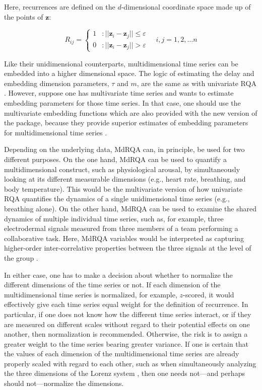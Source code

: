 Here, recurrences are defined on the $d$-dimensional coordinate space made up of the points of $\mathbf{z}$:

\begin{equation}
    R_{ij} = \left\{
  \begin{array}{lr}
    1 & : \vert\vert \mathbf{z}_i - \mathbf{z}_j \vert\vert \leq \varepsilon \\
    0 & : \vert\vert \mathbf{z}_i - \mathbf{z}_j \vert\vert > \varepsilon
  \end{array}
\right.
\quad
i,j = 1,2, \ldots n
\end{equation}

Like their unidimensional counterparts, multidimensional time series can be embedded into a higher dimensional space. The logic of estimating the delay and embedding dimension parameters, $\tau$ and $m$, are the same as with univariate RQA \citep{wallot2017recurrence,wallot2018analyzing}. However, suppose one has multivariate time series and wants to estimate embedding parameters for those time series. In that case, one should use the multivariate embedding functions which are also provided with the new version of the  package, because they provide superior estimates of embedding parameters for multidimensional time series \citep{wallot2018calculation}.

Depending on the underlying data, MdRQA can, in principle, be used for two different purposes. On the one hand, MdRQA can be used to quantify a multidimensional construct, such as physiological arousal, by simultaneously looking at its different measurable dimensions (e.g., heart rate, breathing, and body temperature). This would be the multivariate version of how univariate RQA quantifies the dynamics of a single unidimensional time series (e.g., breathing alone). On the other hand, MdRQA can be used to examine the shared dynamics of multiple individual time series, such as, for example, three electrodermal signals measured from three members of a team performing a collaborative task. Here, MdRQA variables would be interpreted as capturing higher-order inter-correlative properties between the three signals at the level of the group \citep{wallot2016multidimensional}.

In either case, one has to make a decision about whether to normalize the different dimensions of the time series or not. If each dimension of the multidimensional time series is normalized, for example, $z$-scored, it would effectively give each time series equal weight for the definition of recurrence. In particular, if one does not know how the different time series interact, or if they are measured on different scales without regard to their potential effects on one another, then normalization is recommended. Otherwise, the risk is to assign a greater weight to the time series bearing greater variance. If one is certain that the values of each dimension of the multidimensional time series are already properly scaled with regard to each other, such as when simultaneously analyzing the three dimensions of the Lorenz system \citep{Lorenz1963b}, then one needs not---and perhaps should not---normalize the dimensions.

